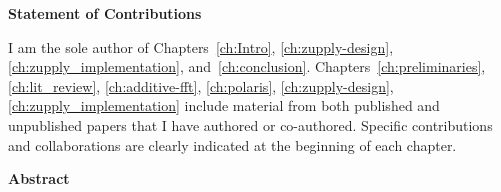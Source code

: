 \cleardoublepage
{}    %

\begin{center}\textbf{Statement of Contributions}\end{center}
I am the sole author of Chapters~\ref{ch:Intro}, \ref{ch:zupply-design}, \ref{ch:zupply_implementation}, and~\ref{ch:conclusion}. Chapters~\ref{ch:preliminaries}, \ref{ch:lit_review}, \ref{ch:additive-fft}, \ref{ch:polaris}, \ref{ch:zupply-design}, \ref{ch:zupply_implementation} include material from both published and unpublished papers that I have authored or co-authored. Specific contributions and collaborations are clearly indicated at the beginning of each chapter.
\cleardoublepage
{}    %
\begin{center}\textbf{Abstract}\end{center}

